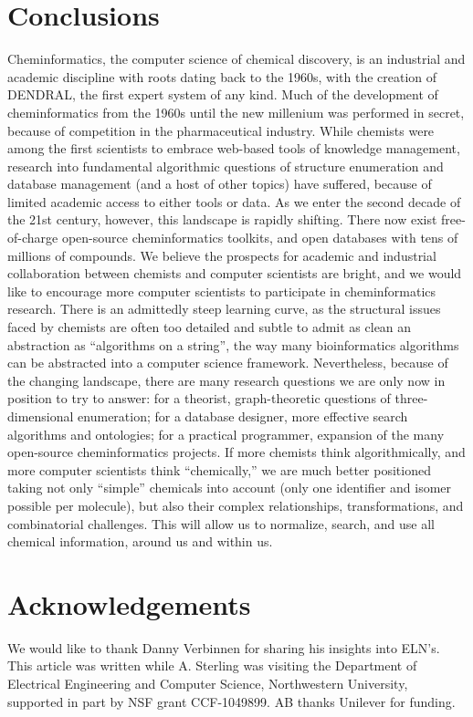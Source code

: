 \documentclass{sig-alternate}
\begin{document}
\section{Conclusions}
\label{sec:conclusions}
Cheminformatics, the computer science of chemical discovery, is an
industrial and academic discipline with roots dating back to the
1960s, with the creation of DENDRAL, the first expert system of any
kind.  Much of the development of cheminformatics from the 1960s until the new millenium
was performed in secret, because of competition in the pharmaceutical
industry.  While chemists were among the first scientists to embrace
web-based tools of knowledge management, research into fundamental
algorithmic questions of structure enumeration and database management
(and a host of other topics) have suffered, because of limited
academic access to either tools or data.  As we enter the second
decade of the 21st century, however, this landscape is rapidly
shifting.  There now exist free-of-charge open-source cheminformatics
toolkits, and open databases with tens of millions of compounds.  We
believe the prospects for academic and industrial collaboration
between chemists and computer scientists are bright, and we
would like to encourage more computer scientists to participate in
cheminformatics research.  There is an admittedly steep learning
curve, as the structural issues faced by chemists are often too
detailed and subtle to admit as clean an abstraction as ``algorithms
on a string'', the way many bioinformatics algorithms can be abstracted into a computer science
framework.  Nevertheless, because of the changing landscape, there are
many research questions we are only now in position to try to answer:
for a theorist, graph-theoretic questions of three-dimensional
enumeration; for a database designer, more effective search algorithms
and ontologies; for a practical programmer, expansion of the many
open-source cheminformatics projects.  If more chemists think
algorithmically, and more computer scientists think ``chemically,''
we are much better positioned taking not only ``simple'' chemicals
into account (only one identifier and isomer possible per molecule),
but also their complex relationships, transformations, and
combinatorial challenges. This will allow us to
normalize, search, and use all chemical information, around us and
within us.

\section*{Acknowledgements}
We would like to thank Danny Verbinnen for sharing his insights into
ELN's.  This article was written while A. Sterling was visiting the
Department of Electrical Engineering and Computer Science,
Northwestern University, supported in part by NSF grant CCF-1049899. AB thanks Unilever for funding.



\end{document}
